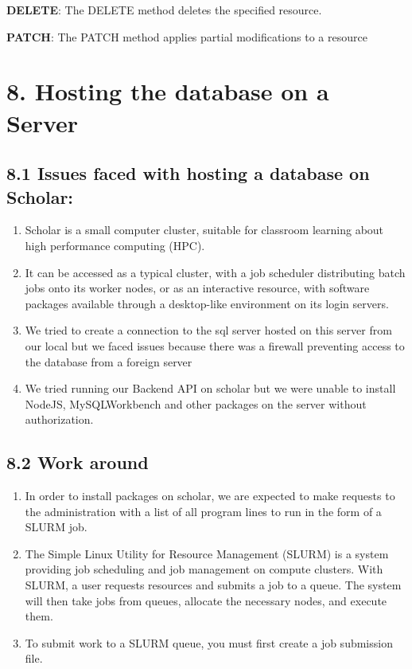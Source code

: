 \documentclass[]{book}
\providecommand{\tightlist}{%
  \setlength{\itemsep}{0pt}\setlength{\parskip}{0pt}}
\begin{document}
\textbf{DELETE}: The DELETE method deletes the specified resource.

\textbf{PATCH}: The PATCH method applies partial modifications to a
resource

\section{8. Hosting the database on a
Server}\label{hosting-the-database-on-a-server-1}

\subsection{8.1 Issues faced with hosting a database on
Scholar:}\label{issues-faced-with-hosting-a-database-on-scholar-1}

\begin{enumerate}
\def\labelenumi{\arabic{enumi}.}
\tightlist
\item
  Scholar is a small computer cluster, suitable for classroom learning
  about high performance computing (HPC).
\item
  It can be accessed as a typical cluster, with a job scheduler
  distributing batch jobs onto its worker nodes, or as an interactive
  resource, with software packages available through a desktop-like
  environment on its login servers.
\item
  We tried to create a connection to the sql server hosted on this
  server from our local but we faced issues because there was a firewall
  preventing access to the database from a foreign server
\item
  We tried running our Backend API on scholar but we were unable to
  install NodeJS, MySQLWorkbench and other packages on the server
  without authorization.
\end{enumerate}

\subsection{8.2 Work around}\label{work-around-1}

\begin{enumerate}
\def\labelenumi{\arabic{enumi}.}
\item
  In order to install packages on scholar, we are expected to make
  requests to the administration with a list of all program lines to run
  in the form of a SLURM job.
\item
  The Simple Linux Utility for Resource Management (SLURM) is a system
  providing job scheduling and job management on compute clusters. With
  SLURM, a user requests resources and submits a job to a queue. The
  system will then take jobs from queues, allocate the necessary nodes,
  and execute them.
\item
  To submit work to a SLURM queue, you must first create a job
  submission file.
\end{enumerate}
\end{document}
